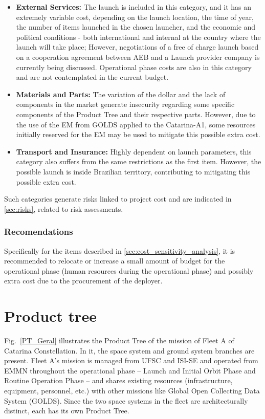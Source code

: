 \begin{itemize}
    \item \textbf{External Services:} The launch is included in this category, and it has an extremely variable cost, depending on the launch location, the time of year, the number of items launched in the chosen launcher, and the economic and political conditions - both international and internal at the country where the launch will take place; However, negotiations of a free of charge launch based on a cooperation agreement between AEB and a Launch provider company is currently being discussed.  Operational phase costs are also in this category and are not contemplated in the current budget.
    \item \textbf{Materials and Parts:} The variation of the dollar and the lack of components in the market generate insecurity regarding some specific components of the Product Tree and their respective parts. However, due to the use of the EM from GOLDS applied to the Catarina-A1, some resources initially reserved for the EM may be used to mitigate this possible extra cost.
    \item \textbf{Transport and Insurance:} Highly dependent on launch parameters, this category also suffers from the same restrictions as the first item. However, the possible launch is inside Brazilian territory, contributing to mitigating this possible extra cost.
\end{itemize}

Such categories generate risks linked to project cost and are indicated in \autoref{sec:risks}, related to risk assessments.

\subsubsection{Recomendations} \label{sec:Recomendations}

Specifically for the items described in \autoref{sec:cost_sensitivity_analysis}, it is recommended to relocate or increase a small amount of budget for the operational phase (human resources during the operational phase) and possibly extra cost due to the procurement of the deployer.

\section{Product tree} \label{sec:product-tree}

Fig.~\ref{PT_Geral} illustrates the Product Tree of the mission of Fleet A of Catarina Constellation. In it, the space system and ground system branches are present. Fleet A’s mission is managed from UFSC and ISI-SE and operated from EMMN throughout the operational phase – Launch and Initial Orbit Phase and Routine Operation Phase – and shares existing resources (infrastructure, equipment, personnel, etc.) with other missions like Global Open Collecting Data System (GOLDS).
Since the two space systems in the fleet are architecturally distinct, each has its own Product Tree.

